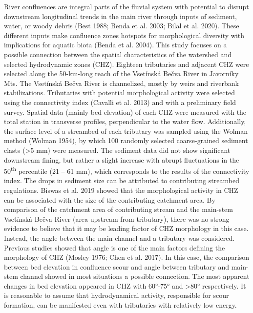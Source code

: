 {
River confluences are integral parts of the fluvial system with potential to disrupt downstream longitudinal trends in the main river through inputs of sediment, water, or woody debris (Best 1988; Benda et al. 2003; Bilal et al. 2020). These different inputs make confluence zones hotspots for morphological diversity with implications for aquatic biota (Benda et al. 2004). This study focuses on a possible connection between the spatial characteristics of the watershed and selected hydrodynamic zones (CHZ). Eighteen tributaries and adjacent CHZ were selected along the 50-km-long reach of the Vsetínská Bečva River in Javorníky Mts. The Vsetínská Bečva River is channelized, mostly by weirs and riverbank stabilizations. Tributaries with potential morphological activity were selected using the connectivity index (Cavalli et al. 2013) and with a preliminary field survey. Spatial data (mainly bed elevation) of each CHZ were measured with the total station in transverse profiles, perpendicular to the water flow. Additionally, the surface level of a streambed of each tributary was sampled using the Wolman method (Wolman 1954), by which 100 randomly selected coarse-grained sediment clasts (>5 mm) were measured. The sediment data did not show significant downstream fining, but rather a slight increase with abrupt fluctuations in the 50\textsuperscript{th} percentile (21 -- 61 mm), which corresponds to the results of the connectivity index. The drops in sediment size can be attributed to contributing streambed regulations. Biswas et al. 2019 showed that the morphological activity in CHZ can be associated with the size of the contributing catchment area. By comparison of the catchment area of contributing stream and the main-stem Vsetínská Bečva River (area upstream from tributary), there was no strong evidence to believe that it may be leading factor of CHZ morphology in this case. Instead, the angle between the main channel and a tributary was considered. Previous studies showed that angle is one of the main factors defining the morphology of CHZ (Mosley 1976; Chen et al. 2017). In this case, the comparison between bed elevation in confluence scour and angle between tributary and main-stem channel showed in most situations a possible connection. The most apparent changes in bed elevation appeared in CHZ with 60°-75° and >80° respectively. It is reasonable to assume that hydrodynamical activity, responsible for scour formation, can be manifested even with tributaries with relatively low energy.
}
